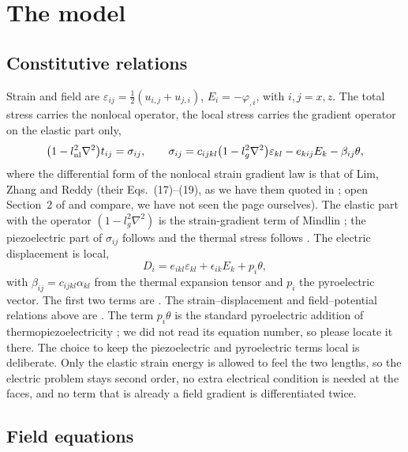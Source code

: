 \documentclass[11pt]{article}
\begin{document}
\section{The model}

\subsection{Constitutive relations}

Strain and field are $\varepsilon_{ij}=\tfrac12(u_{i,j}+u_{j,i})$, $E_i=-\varphi_{,i}$, with $i,j=x,z$.
The total stress carries the nonlocal operator, the local stress carries the gradient operator on the
elastic part only,
\begin{equation}
\bigl(1-l_{\rm nl}^2\nabla^2\bigr)t_{ij}=\sigma_{ij},\qquad
\sigma_{ij}=c_{ijkl}\bigl(1-l_g^2\nabla^2\bigr)\varepsilon_{kl}-e_{kij}E_k-\beta_{ij}\theta ,
\end{equation}
where the differential form of the nonlocal strain gradient law is that of Lim, Zhang and Reddy \cite{Lim2015} (their Eqs.\ (17)--(19), as we have them quoted in \cite[Eq.\ (18)]{Barretta2018}; open Section~2 of \cite{Lim2015} and compare, we have not seen the page ourselves). The elastic part with the operator $(1-l_g^2\nabla^2)$ is the strain-gradient term of Mindlin \cite{Mindlin1964}; the piezoelectric part of $\sigma_{ij}$ follows \cite[Eq.\ (1)]{Zhu2023} and the thermal stress follows \cite[Eq.\ (3.1)]{Quintanilla2019}. The electric displacement is local,
\begin{equation}
D_i=e_{ikl}\varepsilon_{kl}+\epsilon_{ik}E_k+p_i\theta ,
\end{equation}
with $\beta_{ij}=c_{ijkl}\alpha_{kl}$ from the thermal expansion tensor and $p_i$ the pyroelectric vector. The first two terms are \cite[Eq.\ (1)]{Zhu2023}. The strain--displacement and field--potential relations above are \cite[Eq.\ (2)]{Zhu2023}. The term $p_i\theta$ is the standard pyroelectric addition of thermopiezoelectricity \cite{Mindlin1974}; we did not read its equation number, so please locate it there.
The choice to keep the piezoelectric and pyroelectric terms local is deliberate. Only the elastic strain
energy is allowed to feel the two lengths, so the electric problem stays second order, no extra electrical
condition is needed at the faces, and no term that is already a field gradient is differentiated twice.

\subsection{Field equations}
\end{document}

